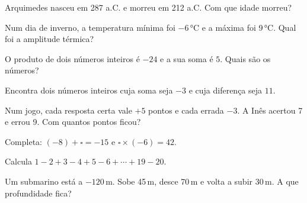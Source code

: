 \documentclass[12pt]{article}
\begin{document}
\begin{exercicios}
  \item Arquimedes nasceu em 287 a.C. e morreu em 212 a.C. Com que idade morreu?
  \item Num dia de inverno, a temperatura mínima foi $-6$\,°C e a máxima foi 9\,°C. Qual foi a amplitude térmica?
  \item O produto de dois números inteiros é $-24$ e a sua soma é $5$. Quais são os números?
  \item Encontra dois números inteiros cuja soma seja $-3$ e cuja diferença seja $11$.
  \item Num jogo, cada resposta certa vale $+5$ pontos e cada errada $-3$. A Inês acertou 7 e errou 9. Com quantos pontos ficou?
  \item Completa: $(-8) + \square = -15$ \quad e \quad $\square \times (-6) = 42$.
  \item Calcula $1 - 2 + 3 - 4 + 5 - 6 + \cdots + 19 - 20$.
  \item Um submarino está a $-120$\,m. Sobe 45\,m, desce 70\,m e volta a subir 30\,m. A que profundidade fica?
\end{exercicios}
\end{document}
